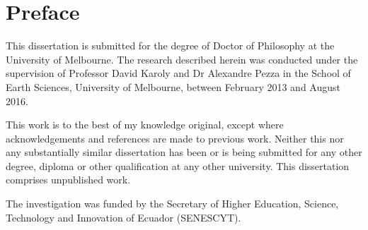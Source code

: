 \chapter*{Preface}

This dissertation is submitted for the degree of Doctor of Philosophy
at the University of Melbourne. The research described herein was
conducted under the supervision of Professor David Karoly and Dr Alexandre
Pezza in the School of Earth Sciences, University of Melbourne, between
February 2013 and August 2016. 

This work is to the best of my knowledge original, except where acknowledgements
and references are made to previous work. Neither this nor any substantially
similar dissertation has been or is being submitted for any other
degree, diploma or other qualification at any other university. This
dissertation comprises unpublished work.

The investigation was funded by the Secretary of Higher Education,
Science, Technology and Innovation of Ecuador (SENESCYT).

